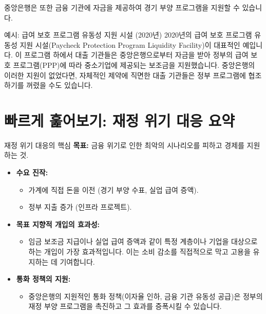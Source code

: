 \documentclass[11pt,a4paper]{article}
\begin{document}
중앙은행은 또한 금융 기관에 자금을 제공하여 경기 부양 프로그램을 지원할 수 있습니다.

\begin{examplebox}{예시: 급여 보호 프로그램 유동성 지원 시설 (2020년)}
    2020년의 급여 보호 프로그램 유동성 지원 시설(Paycheck Protection Program Liquidity Facility)이 대표적인 예입니다. 이 프로그램 하에서 대출 기관들은 중앙은행으로부터 자금을 받아 정부의 급여 보호 프로그램(PPP)에 따라 중소기업에 제공되는 보조금을 지원했습니다. 중앙은행의 이러한 지원이 없었다면, 자체적인 제약에 직면한 대출 기관들은 정부 프로그램에 협조하기를 꺼렸을 수도 있습니다.
\end{examplebox}

\newpage
\section*{빠르게 훑어보기: 재정 위기 대응 요약}

\begin{summarybox}{재정 위기 대응의 핵심}
    \textbf{목표:} 금융 위기로 인한 최악의 시나리오를 피하고 경제를 지원하는 것.
\end{summarybox}

\begin{tcolorbox}[mybox={세 가지 주요 재정 대응 방안}]
    \begin{itemize}
        \item \textbf{수요 진작:}
        \begin{itemize}
            \item 가계에 직접 돈을 이전 (경기 부양 수표, 실업 급여 증액).
            \item 정부 지출 증가 (인프라 프로젝트).
        \end{itemize}
        \item \textbf{목표 지향적 개입의 효과성:}
        \begin{itemize}
            \item 임금 보조금 지급이나 실업 급여 증액과 같이 특정 계층이나 기업을 대상으로 하는 개입이 가장 효과적입니다. 이는 소비 감소를 직접적으로 막고 고용을 유지하는 데 기여합니다.
        \end{itemize}
        \item \textbf{통화 정책의 지원:}
        \begin{itemize}
            \item 중앙은행의 지원적인 통화 정책(이자율 인하, 금융 기관 유동성 공급)은 정부의 재정 부양 프로그램을 촉진하고 그 효과를 증폭시킬 수 있습니다.
        \end{itemize}
    \end{itemize}
\end{tcolorbox}
\end{document}
